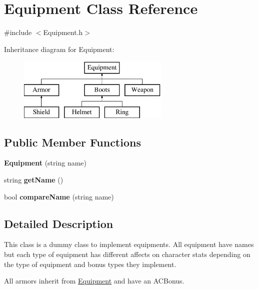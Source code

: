 \hypertarget{class_equipment}{}\section{Equipment Class Reference}
\label{class_equipment}


{\ttfamily \#include $<$Equipment.\+h$>$}

Inheritance diagram for Equipment\+:\begin{figure}[H]
\begin{center}
\leavevmode
\includegraphics[height=3.000000cm]{class_equipment}
\end{center}
\end{figure}
\subsection*{Public Member Functions}
\begin{DoxyCompactItemize}
\item 
\hypertarget{class_equipment_a40b66c38f62cee0ef51b7062d91946bf}{}\label{class_equipment_a40b66c38f62cee0ef51b7062d91946bf} 
{\bfseries Equipment} (string name)
\item 
\hypertarget{class_equipment_abfde2b1761f374597f0efbfbf44b28a3}{}\label{class_equipment_abfde2b1761f374597f0efbfbf44b28a3} 
string {\bfseries get\+Name} ()
\item 
\hypertarget{class_equipment_ad1fe2caf19e8f5c2d7a20610b0aa048b}{}\label{class_equipment_ad1fe2caf19e8f5c2d7a20610b0aa048b} 
bool {\bfseries compare\+Name} (string name)
\end{DoxyCompactItemize}


\subsection{Detailed Description}
This class is a dummy class to implement equipments. All equipment have names but each type of equipment has different affects on character stats depending on the type of equipment and bonus types they implement.

All armors inherit from \hyperlink{class_equipment}{Equipment} and have an A\+C\+Bonus.

